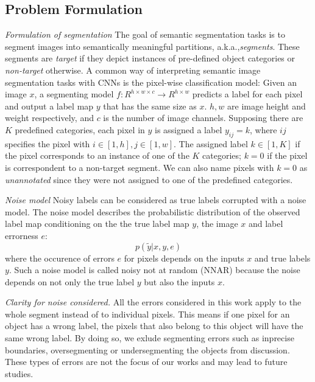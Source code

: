 \subsection{Problem Formulation}
\label{subsec:formulation}

\noindent \textit{Formulation of segmentation}
\noindent
The goal of semantic segmentation tasks is to segment images into semantically meaningful partitions, a.k.a.,\textit{segments}.
These segments are \textit{target} if they depict instances of pre-defined object categories or \textit{non-target} otherwise.
A common way of interpreting semantic image segmentation tasks with CNNs is the pixel-wise classification model:
Given an image $x$, a segmenting model $f: R^{h \times w \times c} \rightarrow R^{h \times w}$ predicts a label for each pixel and output a label map $y$ that has the same size as $x$.
$h, w$ are image height and weight respectively, and $c$ is the number of image channels.
Supposing there are $K$ predefined categories, each pixel in $y$ is assigned a label $y_{ij}=k$, where $ij$ specifies the pixel with $i \in [1,h], j \in [1,w]$.
The assigned label $k \in [1, K]$ if the pixel corresponds to an instance of one of the $K$ categories; $k=0$ if the pixel is correspondent to a non-target segment.
We can also name pixels with $k=0$ as \textit{unannotated} since they were not assigned to one of the predefined categories.

\noindent \textit{Noise model}
\noindent
Noisy labels can be considered as true labels corrupted with a noise model.
The noise model describes the probabilistic distribution of the observed label map conditioning on the the true label map $y$, the image $x$ and label errorness $e$:
$$p(\tilde{y} \vert x, y, e)$$
where the occurence of errors $e$ for pixels depends on the inputs $x$ and true labels $y$.
Such a noise model is called noisy not at random (NNAR) \cite{frenay2014classification} because the noise depends on not only the true label $y$ but also the inputs $x$.

\noindent \textit{Clarity for noise considered.}
\noindent
All the errors considered in this work apply to the whole segment instead of to individual pixels.
This means if one pixel for an object has a wrong label, the pixels that also belong to this object will have the same wrong label.
By doing so, we exlude segmenting errors such as inprecise boundaries, oversegmenting or undersegmenting the objects from discussion.
These types of errors are not the focus of our works and may lead to future studies.

